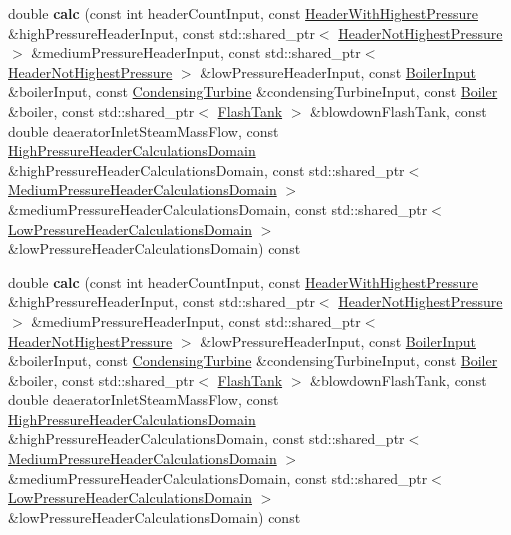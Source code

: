 \begin{DoxyCompactItemize}
double {\bfseries calc} (const int header\+Count\+Input, const \hyperlink{class_header_with_highest_pressure}{Header\+With\+Highest\+Pressure} \&high\+Pressure\+Header\+Input, const std\+::shared\+\_\+ptr$<$ \hyperlink{class_header_not_highest_pressure}{Header\+Not\+Highest\+Pressure} $>$ \&medium\+Pressure\+Header\+Input, const std\+::shared\+\_\+ptr$<$ \hyperlink{class_header_not_highest_pressure}{Header\+Not\+Highest\+Pressure} $>$ \&low\+Pressure\+Header\+Input, const \hyperlink{class_boiler_input}{Boiler\+Input} \&boiler\+Input, const \hyperlink{class_condensing_turbine}{Condensing\+Turbine} \&condensing\+Turbine\+Input, const \hyperlink{class_boiler}{Boiler} \&boiler, const std\+::shared\+\_\+ptr$<$ \hyperlink{class_flash_tank}{Flash\+Tank} $>$ \&blowdown\+Flash\+Tank, const double deaerator\+Inlet\+Steam\+Mass\+Flow, const \hyperlink{class_high_pressure_header_calculations_domain}{High\+Pressure\+Header\+Calculations\+Domain} \&high\+Pressure\+Header\+Calculations\+Domain, const std\+::shared\+\_\+ptr$<$ \hyperlink{class_medium_pressure_header_calculations_domain}{Medium\+Pressure\+Header\+Calculations\+Domain} $>$ \&medium\+Pressure\+Header\+Calculations\+Domain, const std\+::shared\+\_\+ptr$<$ \hyperlink{class_low_pressure_header_calculations_domain}{Low\+Pressure\+Header\+Calculations\+Domain} $>$ \&low\+Pressure\+Header\+Calculations\+Domain) const
\item 
\mbox{\label{class_steam_balance_calculator_a34acbdf14e3c671b55abfede65ede138}} 
double {\bfseries calc} (const int header\+Count\+Input, const \hyperlink{class_header_with_highest_pressure}{Header\+With\+Highest\+Pressure} \&high\+Pressure\+Header\+Input, const std\+::shared\+\_\+ptr$<$ \hyperlink{class_header_not_highest_pressure}{Header\+Not\+Highest\+Pressure} $>$ \&medium\+Pressure\+Header\+Input, const std\+::shared\+\_\+ptr$<$ \hyperlink{class_header_not_highest_pressure}{Header\+Not\+Highest\+Pressure} $>$ \&low\+Pressure\+Header\+Input, const \hyperlink{class_boiler_input}{Boiler\+Input} \&boiler\+Input, const \hyperlink{class_condensing_turbine}{Condensing\+Turbine} \&condensing\+Turbine\+Input, const \hyperlink{class_boiler}{Boiler} \&boiler, const std\+::shared\+\_\+ptr$<$ \hyperlink{class_flash_tank}{Flash\+Tank} $>$ \&blowdown\+Flash\+Tank, const double deaerator\+Inlet\+Steam\+Mass\+Flow, const \hyperlink{class_high_pressure_header_calculations_domain}{High\+Pressure\+Header\+Calculations\+Domain} \&high\+Pressure\+Header\+Calculations\+Domain, const std\+::shared\+\_\+ptr$<$ \hyperlink{class_medium_pressure_header_calculations_domain}{Medium\+Pressure\+Header\+Calculations\+Domain} $>$ \&medium\+Pressure\+Header\+Calculations\+Domain, const std\+::shared\+\_\+ptr$<$ \hyperlink{class_low_pressure_header_calculations_domain}{Low\+Pressure\+Header\+Calculations\+Domain} $>$ \&low\+Pressure\+Header\+Calculations\+Domain) const
\end{DoxyCompactItemize}


